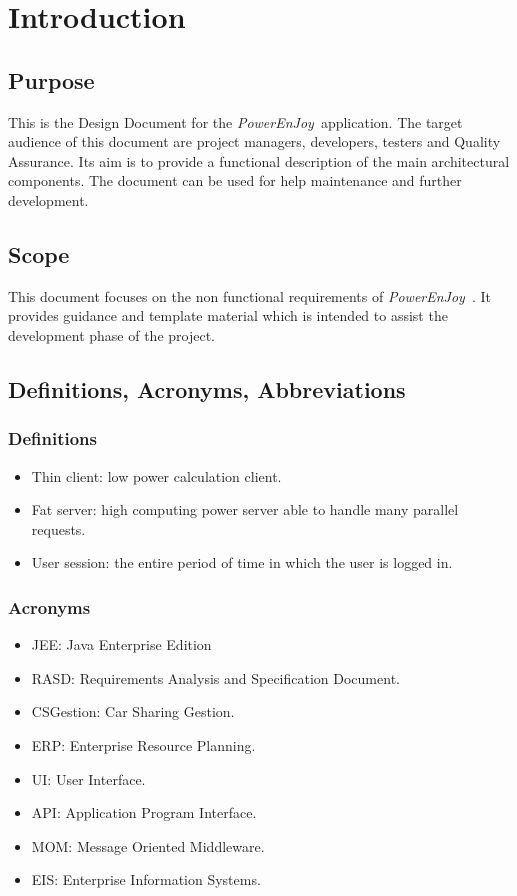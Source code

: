 \documentclass{article}
\newcommand{\pej}{\mbox{\normalfont\itshape PowerEnJoy }}
\begin{document}
	\newpage
	
	\section{Introduction}
		\subsection{Purpose}
		This is the Design Document for the \pej application. The target audience of this document are project managers, developers, testers and Quality Assurance. Its aim is to provide a functional description of the main architectural components. The document can be used for help maintenance and further development.
		\subsection{Scope}
		This document focuses on the non functional requirements of \pej. It provides guidance and template material which is intended to assist the development phase of the project.
		\subsection{Definitions, Acronyms, Abbreviations}
		\subsubsection{Definitions}
		\begin{itemize}
			\item Thin client: low power calculation client.
			\item Fat server: high computing power server able to handle many parallel requests.
			\item User session: the entire period of time in which the user is logged in.
		\end{itemize}
		\subsubsection{Acronyms}
		\begin{itemize}
			\item JEE: Java Enterprise Edition
			\item RASD: Requirements Analysis and Specification Document.
			\item CSGestion: Car Sharing Gestion.
			\item ERP: Enterprise Resource Planning.
			\item UI: User Interface.
			\item API: Application Program Interface.
			\item MOM: Message Oriented Middleware.
			\item EIS: Enterprise Information Systems.
		\end{itemize}
\end{document}
